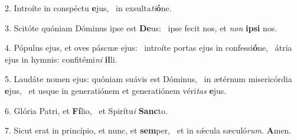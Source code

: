 2. Introíte in conspéctu \textbf{e}jus, \ast\  in exsulta\textit{ti}\textbf{ó}ne.\

3. Scitóte quóniam Dóminus ipse est \textbf{De}us: \ast\  ipse fecit nos, et \textit{non} \textbf{ip}\textbf{si} nos.\

4. Pópulus ejus, et oves páscuæ ejus: \dag\  introíte portas ejus in confessi\textbf{ó}ne, \ast\  átria ejus in hymnis: confitémi\textit{ni} \textbf{il}li.\

5. Laudáte nomen ejus: quóniam suávis est Dóminus, \dag\  in ætérnum misericórdia \textbf{e}jus, \ast\  et usque in generatiónem et generatiónem véri\textit{tas} \textbf{e}jus.\

6. Glória Patri, et \textbf{Fí}lio, \ast\  et Spirítu\textit{i} \textbf{Sanc}to.\

7. Sicut erat in princípio, et nunc, et \textbf{sem}per, \ast\  et in sǽcula sæculó\textit{rum}. \textbf{A}men.\

